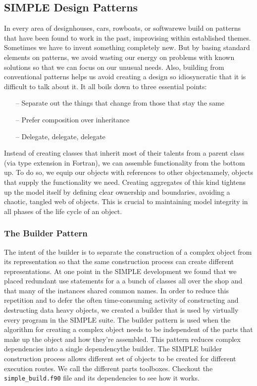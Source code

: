 \documentclass[a4paper,11pt]{article}
\begin{document}
\subsection{SIMPLE Design Patterns}
In every area of design\textemdash{}houses, cars, rowboats, or software\textemdash{}we build on patterns that have been found to work in the past, improvising within established themes. Sometimes we have to invent something completely new. But by basing standard elements on patterns, we avoid wasting our energy on problems with known solutions so that we can focus on our unusual needs. Also, building from conventional patterns helps us avoid creating a design so idiosyncratic that it is difficult to talk about it. It all boils down to three essential points:
\begin{itemize}
    \item[--] Separate out the things that change from those that stay the same
    \item[--] Prefer composition over inheritance
    \item[--] Delegate, delegate, delegate
\end{itemize}
Instead of creating classes that inherit most of their talents from a parent class (via type extension in Fortran), we can assemble functionality from the bottom up. To do so, we equip our objects with references to other objects\textemdash{}namely, objects that supply the functionality we need. Creating aggregates of this kind tightens up the model itself by defining clear ownership and boundaries, avoiding a chaotic, tangled web of objects. This is crucial to maintaining model integrity in all phases of the life cycle of an object.

\subsubsection{The Builder Pattern}
The intent of the builder is to separate the construction of a complex object from its representation so that the same construction process can create different representations. At one point in the SIMPLE development we found that we placed redundant use statements for a a bunch of classes all over the shop and that many of the instances shared common names. In order to reduce this repetition and to defer the often time-consuming activity of constructing and destructing data heavy objects, we created a builder that is used by virtually every program in the SIMPLE suite. The builder pattern is used when the algorithm for creating a complex object needs to be independent of the parts that make up the object and how they're assembled. This pattern reduces complex dependencies into a single dependency\textemdash{}the builder. The SIMPLE builder construction process allows different set of objects to be created for different execution routes. We call the different parts toolboxes. Checkout the \texttt{simple\_build.f90} file and its dependencies to see how it works.
\end{document}
